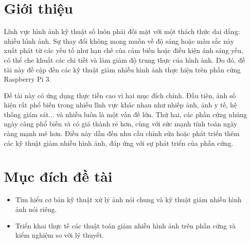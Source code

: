 \documentclass[a4paper,12pt]{article}
\begin{document}
\renewcommand{\refname}{Tài liệu tham khảo} %
\renewcommand{\listfigurename}{Danh sách hình minh họa}



\tableofcontents

\newpage
{} 

\section{Giới thiệu}

Lĩnh vực hình ảnh kỹ thuật số luôn phải đối mặt với một thách thức dai dẳng: nhiễu hình ảnh. 
Sự thay đổi không mong muốn về độ sáng hoặc màu sắc này xuất phát từ các yếu tố như hạn chế của cảm biến hoặc điều kiện ánh sáng yếu, có thể che khuất các chi tiết và làm giảm độ trung thực của hình ảnh. 
Do đó, đề tài này đề cập đến các kỹ thuật giảm nhiễu hình ảnh thực hiện trên phần cứng Raspberry Pi 3. 

Đề tài này có ứng dụng thực tiễn cao vì hai mục đích chính. 
Đầu tiên, ảnh số hiện rất phổ biến trong nhiều lĩnh vực khác nhau như nhiếp ảnh, ảnh y tế, hệ thống giám sát... và nhiễu luôn là một vấn đề lớn.
Thứ hai, các phần cứng nhúng ngày càng phổ biến và có giá thành rẻ hơn, cùng với sức mạnh tính toán ngày càng mạnh mẽ hơn.
Điều này dẫn đến nhu cầu chỉnh sửa hoặc phát triển thêm các kỹ thuật giảm nhiễu hình ảnh, đáp ứng với sự phát triển của phần cứng.

\section{Mục đích đề tài}

\begin{itemize}
    \item Tìm hiểu cơ bản kỹ thuật xử lý ảnh nói chung và kỹ thuật giảm nhiễu hình ảnh nói riêng.
    \item Triển khai thực tế các thuật toán giảm nhiễu hình ảnh trên phần cứng và kiểm nghiệm so với lý thuyết.
\end{itemize}






\end{document}
